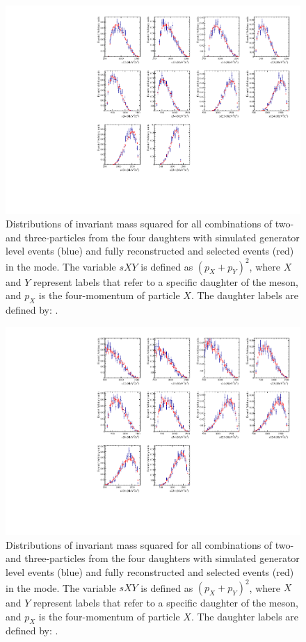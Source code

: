 \begin{figure}[h]
\centering
\includegraphics[width=0.9\linewidth]{figures/results/dalitzDist_KPiPiPi.pdf}
\caption{Distributions of invariant mass squared for all combinations of two- and three-particles from the four \Dz daughters with simulated generator level events (blue) and fully reconstructed and selected events (red) in the \kpipipi mode. The variable $sXY$ is defined as $(p_X + p_Y)^2$, where $X$ and $Y$ represent labels that refer to a specific daughter of the \Dz meson, and $p_X$ is the four-momentum of particle $X$. The \Dz daughter labels are defined by: .}
\label{dalitzk3pi}
\end{figure}

\begin{figure}[h]
\centering
\includegraphics[width=0.9\linewidth]{figures/results/dalitzDist_PiPiPiPi.pdf}
\caption{Distributions of invariant mass squared for all combinations of two- and three-particles from the four \Dz daughters with simulated generator level events (blue) and fully reconstructed and selected events (red) in the \pipipipi mode. The variable $sXY$ is defined as $(p_X + p_Y)^2$, where $X$ and $Y$ represent labels that refer to a specific daughter of the \Dz meson, and $p_X$ is the four-momentum of particle $X$. The \Dz daughter labels are defined by: .}
\label{dalitz4pi}
\end{figure}

